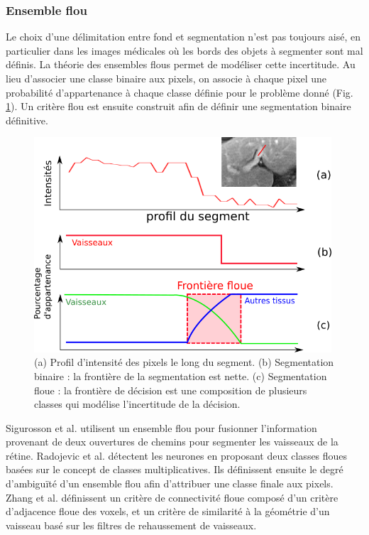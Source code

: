       \subsubsection{Ensemble flou}
      Le choix d'une délimitation entre fond et segmentation n'est pas toujours aisé, en particulier dans les images médicales où les bords des objets à segmenter sont mal définis. La théorie des ensembles flous permet de modéliser cette incertitude. Au lieu d'associer une classe binaire aux pixels, on associe à chaque pixel une probabilité d'appartenance à chaque classe définie pour le problème donné (Fig. \ref{fig:fuzzy_segmentation}). Un critère flou est ensuite construit afin de définir une segmentation binaire définitive.
      \begin{figure}[h]
        \centering
        \includegraphics[height=8cm]{Images/fuzzy_segmentation.png}
        \caption{(a) Profil d'intensité des pixels le long du segment. (b) Segmentation binaire : la frontière de la segmentation est nette. (c) Segmentation floue : la frontière de décision est une composition de plusieurs classes qui modélise l'incertitude de la décision.}
        \label{fig:fuzzy_segmentation}
      \end{figure}
      Sigurosson et al. \cite{Sigurosson2014_retinal_morpho_fuzzy} utilisent un ensemble flou pour fusionner l'information provenant de deux ouvertures de chemins pour segmenter les vaisseaux de la rétine. 
      Radojevic et al. \cite{Radojevic2015_fuzzy_logic} détectent les neurones en proposant deux classes floues basées sur le concept de classes multiplicatives. Ils définissent ensuite le degré d'ambiguïté d'un ensemble flou afin d'attribuer une classe finale aux pixels.
      Zhang et al. \cite{Zhang2018_liver_fuzzy_connectedness} définissent un critère de connectivité floue composé d'un critère d'adjacence floue des voxels, et un critère de similarité à la géométrie d'un vaisseau basé sur les filtres de rehaussement de vaisseaux.  
